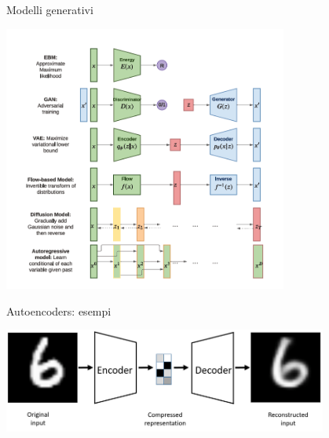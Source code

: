 \documentclass[11pt]{beamer}
\begin{document}
\begin{frame}{Modelli generativi \cite{pml1Book,pml2Book}}
\begin{center}
\includegraphics[width=0.7\textwidth]{Pic/generative_models.png}
\end{center}
\end{frame}

\begin{frame}{Autoencoders: esempi \cite{pml1Book,pml2Book,autoencoder_comp}}
\begin{center}
\includegraphics[width=0.8\textwidth]{Pic/CompressionVAE.png}
\end{center}
\end{frame}
\end{document}
